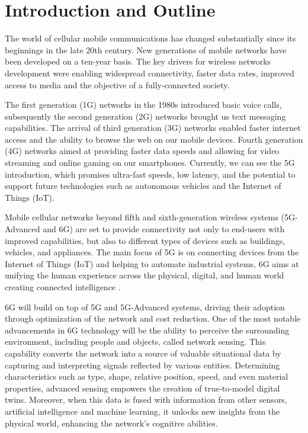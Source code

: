 \chapter{Introduction and Outline}
\label{chap_intro}

The world of cellular mobile communications has changed substantially since its beginnings in the late 20th century.
New generations of mobile networks have been developed on a ten-year basis. The key drivers for wireless networks development were enabling widespread connectivity, faster data rates, improved access to media and the objective of a fully-connected society.

The first generation (1G) networks in the 1980s introduced basic voice calls, subsequently the second generation (2G) networks brought us text messaging capabilities. The arrival of third generation (3G) networks enabled faster internet access and the ability to browse the web on our mobile devices. 
Fourth generation (4G) networks aimed at providing faster data speeds and allowing for video streaming and online gaming on our smartphones. 
Currently, we can see the \gls{5G} introduction, which promises ultra-fast speeds, low latency, and the potential to support future technologies such as autonomous vehicles and the Internet of Things (IoT). 

Mobile cellular networks beyond fifth and sixth-generation wireless systems (\gls{5G}-Advanced and 6G) are set to provide connectivity not only to end-users with improved capabilities, but also to different types of devices such as buildings, vehicles, and appliances.
The main focus of \gls{5G} is on connecting devices from the Internet of Things (IoT) and helping to automate industrial systems, 6G aims at unifying the human experience across the physical, digital, and human world creating connected intelligence \cite{6G-explained-NOKIA}.


6G will build on top of \gls{5G} and \gls{5G}-Advanced systems, driving their adoption through optimization of the network and cost reduction. 
One of the most notable advancements in 6G technology will be the ability to perceive the surrounding environment, including people and objects, called network sensing. This capability converts the network into a source of valuable situational data by capturing and interpreting signals reflected by various entities. 
Determining characteristics such as type, shape, relative position, speed, and even material properties, advanced sensing empowers the creation of true-to-model digital twins.
Moreover, when this data is fused with information from other sensors, artificial intelligence and machine learning, it unlocks new insights from the physical world, enhancing the network's cognitive abilities.


